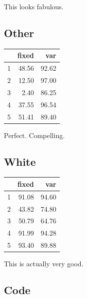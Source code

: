 \documentclass{amsart}
\begin{document}
This looks fabulous.

\subsection{Other}

\begin{table}[ht]
\centering
\begin{tabular}{rrr}
  \hline
 & fixed & var \\ 
  \hline
1 & 48.56 & 92.62 \\ 
  2 & 12.50 & 97.00 \\ 
  3 & 2.40 & 86.25 \\ 
  4 & 37.55 & 96.54 \\ 
  5 & 51.41 & 89.40 \\ 
   \hline
\end{tabular}
\end{table}

Perfect.  Compelling.

\subsection{White}
\begin{table}[ht]
\centering
\begin{tabular}{rrr}
  \hline
 & fixed & var \\ 
  \hline
1 & 91.08 & 94.60 \\ 
  2 & 43.82 & 74.80 \\ 
  3 & 50.79 & 64.76 \\ 
  4 & 91.99 & 94.28 \\ 
  5 & 93.40 & 89.88 \\ 
   \hline
\end{tabular}
\end{table}

This is actually very good.

\subsection{Code}
\end{document}
